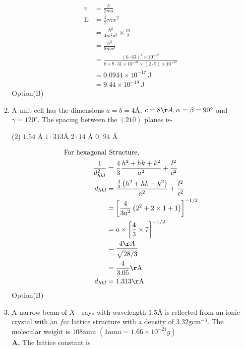 \begin{enumerate}
\begin{answer}
$$
\begin{aligned}
v &=\frac{h}{2 m a} \\
\mathrm{E} &=\frac{1}{2} m v^{2} \\
& =\frac{h^{2}}{4 m^{2} a^{2}} \times \frac{m}{2}\\&=\frac{h^{2}}{8 m a^{2}} \\
& =\frac{(6 \cdot 63)^{2} \times 10^{-68}}{8 \times 9 \cdot 31 \times 10^{-31} \times(2 \cdot 5) \times 10^{-20}} \\
& =0.0944 \times 10^{-17} \mathrm{~J} \\
& =9 . 44 \times 10^{-19} \mathrm{~J}
\end{aligned}
$$
Option(B)
\end{answer}
  \item A unit cell has the dimensions $a=b=4 $\AA, $c=8 \AA, \alpha=\beta=90^{\circ}$ and $\gamma=120^{\circ}$. The spacing between the $(210)$ planes is-
  \begin{tasks}(2)
  	\task[\textbf{a.}]  $1.54 $ \AA
  	\task[\textbf{b.}]$1 \cdot 313 $\AA
  	\task[\textbf{c.}]$2 \cdot 14 $ \AA
  	\task[\textbf{d.}] $0 \cdot 94 $ \AA
  \end{tasks}

\begin{answer}
	$$
	\begin{aligned}
	\text{For hexagonal}&\text{ Structure,  }\\
	\frac{1}{d_{h k l}^{2}}&=\frac{4}{3} \frac{h^{2}+h k+k^{2}}{a^{2}}+\frac{l^{2}}{c^{2}}\\
	d_{h k l} &=\frac{\frac{4}{3}\left(h^{2}+h k+k^{2}\right)}{a^{2}}+\frac{l^{2}}{c^{2}} \\
	&=\left[\frac{4}{3 a^{2}}\left(2^{2}+2 \times 1+1\right)\right]^{-1 / 2} \\
	&=a \times\left[\frac{4}{3} \times 7\right]^{-1 / 2} \\
	&=\frac{4 \AA}{\sqrt{28 / 3}} \\
	&=\frac{4}{3.05} \text{\AA} \\
	d_{h k l} &=1.313 \text{\AA}
	\end{aligned}
	$$
	Option(B)
\end{answer}
	\item A narrow beam of $X$ - rays with wavelength $1.5 \text{\AA}$ is reflected from an ionic crystal with an $f c c$ lattice structure with a density of $3.32 \mathrm{gcm}^{-3}$. The molecular weight is $108 \mathrm{amu}$ $\left(1 a m u=1.66 \times 10^{-24} g\right)$\\
\textbf{	A.} The lattice constant is
{}


\end{enumerate}
